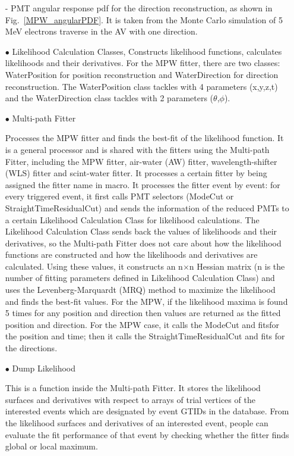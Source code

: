 \begin{itemize}
- PMT angular response pdf for the direction reconstruction, as shown in Fig.~\ref{MPW_angularPDF}. It is taken from the Monte Carlo simulation of 5 MeV electrons traverse in the AV with one direction.



\item[$\bullet$]  Likelihood Calculation Classes, 
Constructs likelihood functions, calculates likelihoods and their derivatives. For the MPW fitter, there are two classes: WaterPosition for position reconstruction and WaterDirection for direction reconstruction. The WaterPosition class tackles with 4 parameters (x,y,z,t) and the WaterDirection class tackles with 2 parameters ($\theta$,$\phi$). 


\item[$\bullet$] Multi-path Fitter

Processes the MPW fitter and finds the best-fit of the likelihood function. It is a general processor and is shared with the fitters using the Multi-path Fitter, including the MPW fitter, air-water (AW) fitter, wavelength-shifter (WLS) fitter and scint-water fitter. It processes a certain fitter by being assigned the fitter name in macro. It processes the fitter event by event: for every triggered event, it first calls PMT selectors (ModeCut or StraightTimeResidualCut) and sends the information of the reduced PMTs to a certain Likelihood Calculation Class for likelihood calculations. The Likelihood Calculation Class sends back the values of likelihoods and their derivatives, so the Multi-path Fitter does not care about how the likelihood functions are constructed and how the likelihoods and derivatives are calculated. Using these values, it constructs an n$\times$n Hessian matrix (n is the number of fitting parameters defined in Likelihood Calculation Class) and uses the Levenberg-Marquardt (MRQ) method to maximize the likelihood and finds the best-fit values. For the MPW, if the likelihood maxima is found 5 times for any position and direction then values are returned as the fitted position and direction. For the MPW case, it calls the ModeCut and fitsfor the position and time; then it calls the StraightTimeResidualCut and fits for the directions.

\item[$\bullet$] Dump Likelihood

This is a function inside the Multi-path Fitter. It stores the likelihood surfaces and derivatives with respect to arrays of trial vertices of the interested events which are designated by event GTIDs in the database. From the likelihood surfaces and derivatives of an interested event, people can evaluate the fit performance of that event by checking whether the fitter finds global or local maximum. 


\end{itemize}
